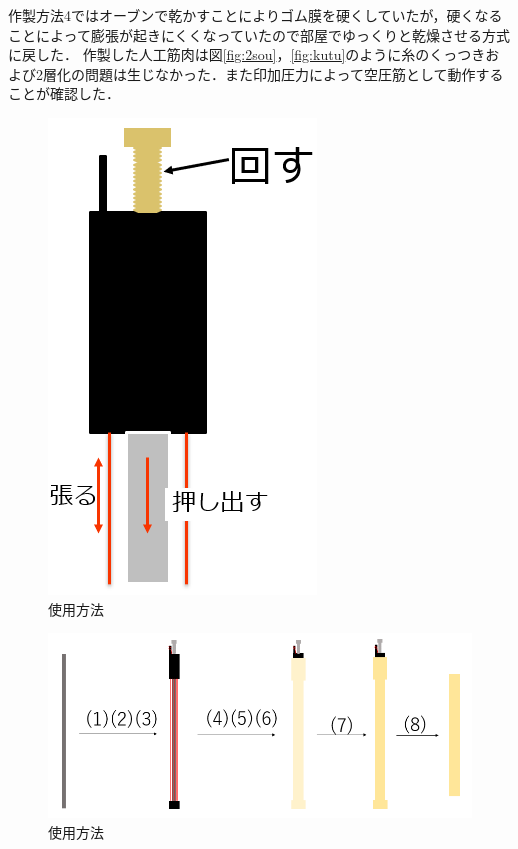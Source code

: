 作製方法4ではオーブンで乾かすことによりゴム膜を硬くしていたが，硬くなることによって膨張が起きにくくなっていたので部屋でゆっくりと乾燥させる方式に戻した．
作製した人工筋肉は図\ref{fig:2sou}，\ref{fig:kutu}のように糸のくっつきおよび2層化の問題は生じなかった．また印加圧力によって空圧筋として動作することが確認した．
\begin{figure}[htbp]
  \centering  %
  \includegraphics[scale=0.4]{pic/mawa.PNG}
  \caption{使用方法}
  \label{fig:mawa}
\end{figure}
\begin{figure}[htbp]
  \centering  %
  \includegraphics[scale=0.4]{pic/ten.PNG}
  \caption{使用方法}
  \label{fig:ten}
\end{figure}
